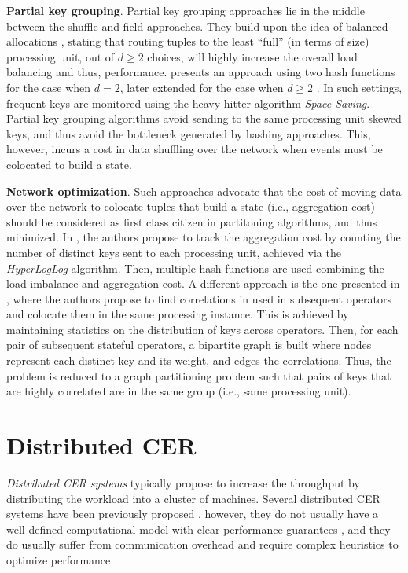 \textbf{Partial key grouping}. Partial key grouping approaches lie in the middle between the shuffle and field approaches. They build upon the idea of balanced allocations \cite{DBLP:journals/siamcomp/AzarBKU99}, stating that routing tuples to the least ``full'' (in terms of size) processing unit, out of $d \geq 2$ choices, will highly increase the overall load balancing and thus, performance. \cite{DBLP:conf/icde/NasirMGKS15} presents an approach using two hash functions for the case when $d = 2$, later extended for the case when $d \geq 2$ \cite{load-balancing-2}. In such settings, frequent keys are monitored using the heavy hitter algorithm \textit{Space Saving}. Partial key grouping algorithms avoid sending to the same processing unit skewed keys, and thus avoid the bottleneck generated by hashing approaches. This, however, incurs a cost in data shuffling over the network when events must be colocated to build a state.

\textbf{Network optimization}. Such approaches advocate that the cost of moving data over the network to colocate tuples that build a state (i.e., aggregation cost) should be considered as first class citizen in partitoning algorithms, and thus minimized. In \cite{DBLP:journals/pvldb/KatsipoulakisLC17}, the authors propose to track the aggregation cost by counting the number of distinct keys sent to each processing unit, achieved via the \textit{HyperLogLog} algorithm. Then, multiple hash functions are used combining the load imbalance and aggregation cost. A different approach is the one presented in \cite{DBLP:conf/middleware/CaneillELP16}, where the authors propose to find correlations in used in subsequent operators and colocate them in the same processing instance. This is achieved by maintaining statistics on the distribution of keys across operators. Then, for each pair of subsequent stateful operators, a bipartite graph is built where nodes represent each distinct key and its weight, and edges the correlations. Thus, the problem is reduced to a graph partitioning problem such that pairs of keys that are highly correlated are in the same group (i.e., same processing unit).

\section{Distributed CER}\label{sec:distributed-cer}

\emph{Distributed CER systems} typically propose to increase the throughput by distributing the workload into a cluster of machines. Several distributed CER systems have been previously proposed \cite{esper, flink-cep, next-cep, distributed-related-work-1, distributed-related-work-2}, however, they do not usually have a well-defined computational model with clear performance guarantees \cite{distributed-related-work-1}, and they do usually suffer from communication overhead and require complex heuristics to optimize performance \cite{distributed-related-work-2}

